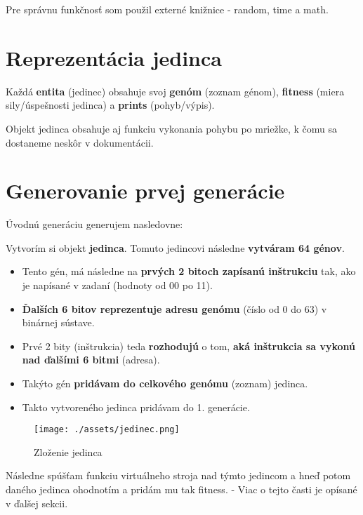 \documentclass[10pt,oneside,slovak,a4paper]{article}
\begin{document}
Pre správnu funkčnosť som použil externé knižnice - random, time a math.

\section{Reprezentácia jedinca}

Každá \textbf{entita} (jedinec) obsahuje svoj \textbf{genóm} (zoznam génom), \textbf{fitness} (miera sily/úspešnosti jedinca) a \textbf{prints} (pohyb/výpis).

Objekt jedinca obsahuje aj funkciu vykonania pohybu po mriežke, k čomu sa dostaneme neskôr v dokumentácii.

\section{Generovanie prvej generácie}

Úvodnú generáciu generujem nasledovne:

Vytvorím si objekt \textbf{jedinca}. Tomuto jedincovi následne \textbf{vytváram 64 génov}. 

\begin{itemize}
\item{Tento gén, má následne na \textbf{prvých 2 bitoch zapísanú inštrukciu} tak, ako je napísané v zadaní (hodnoty od 00 po 11).}

\item{\textbf{Ďalších 6 bitov reprezentuje adresu genómu} (číslo od 0 do 63) v binárnej sústave.}

\item{Prvé 2 bity (inštrukcia) teda \textbf{rozhodujú} o tom, \textbf{aká inštrukcia sa vykonú nad ďalšími 6 bitmi} (adresa).}

\item{Takýto gén \textbf{pridávam do celkového genómu} (zoznam) jedinca.}

\item{Takto vytvoreného jedinca pridávam do 1. generácie.}
\end{itemize}

\begin{figure}[h]
\centerline{\texttt{[image: ./assets/jedinec.png]}} 
\caption{Zloženie jedinca}
\end{figure}

Následne spúšťam funkciu virtuálneho stroja nad týmto jedincom a hneď potom daného jedinca ohodnotím a pridám mu tak fitness. - Viac o tejto časti je opísané v ďalšej sekcii.
\end{document}
